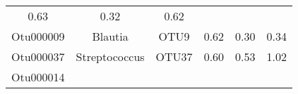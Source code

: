 \documentclass[12pt,]{article}
\begin{document}
\begin{longtable}[]{@{}cccccc@{}}
\begin{minipage}[t]{0.22\columnwidth}
0.63\strut
\end{minipage} & \begin{minipage}[t]{0.17\columnwidth}\centering\strut
0.32\strut
\end{minipage} & \begin{minipage}[t]{0.04\columnwidth}\centering\strut
0.62\strut
\end{minipage}\tabularnewline
\begin{minipage}[t]{0.08\columnwidth}\centering\strut
Otu000009\strut
\end{minipage} & \begin{minipage}[t]{0.17\columnwidth}\centering\strut
Blautia\strut
\end{minipage} & \begin{minipage}[t]{0.15\columnwidth}\centering\strut
OTU9\strut
\end{minipage} & \begin{minipage}[t]{0.22\columnwidth}\centering\strut
0.62\strut
\end{minipage} & \begin{minipage}[t]{0.17\columnwidth}\centering\strut
0.30\strut
\end{minipage} & \begin{minipage}[t]{0.04\columnwidth}\centering\strut
0.34\strut
\end{minipage}\tabularnewline
\begin{minipage}[t]{0.08\columnwidth}\centering\strut
Otu000037\strut
\end{minipage} & \begin{minipage}[t]{0.17\columnwidth}\centering\strut
Streptococcus\strut
\end{minipage} & \begin{minipage}[t]{0.15\columnwidth}\centering\strut
OTU37\strut
\end{minipage} & \begin{minipage}[t]{0.22\columnwidth}\centering\strut
0.60\strut
\end{minipage} & \begin{minipage}[t]{0.17\columnwidth}\centering\strut
0.53\strut
\end{minipage} & \begin{minipage}[t]{0.04\columnwidth}\centering\strut
1.02\strut
\end{minipage}\tabularnewline
\begin{minipage}[t]{0.08\columnwidth}\centering\strut
Otu000014\strut
\end{minipage} & \begin{minipage}[t]{0.17\columnwidth}\centering\strut

\end{minipage}
\end{longtable}
\end{document}
